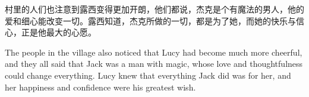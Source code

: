 村里的人们也注意到露西变得更加开朗，他们都说，杰克是个有魔法的男人，他的爱和细心能改变一切。露西知道，杰克所做的一切，都是为了她，而她的快乐与信心，正是他最大的心愿。

\begin{flushright}
The people in the village also noticed that Lucy had become much more cheerful, and they all said that Jack was a man with magic, whose love and thoughtfulness could change everything. Lucy knew that everything Jack did was for her, and her happiness and confidence were his greatest wish.
\end{flushright}
